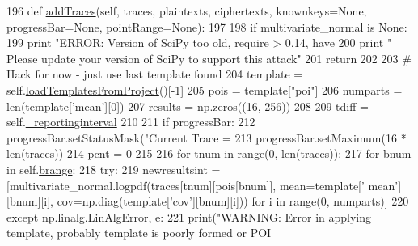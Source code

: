 \begin{DoxyCode}
196     \textcolor{keyword}{def }\hyperlink{classsoftware_1_1chipwhisperer_1_1analyzer_1_1attacks_1_1profiling__algorithms_1_1template_1_1ProfilingTemplate_ab2ab00186a9f5f55029d96a0507f5705}{addTraces}(self, traces, plaintexts, ciphertexts, knownkeys=None, progressBar=None, 
      pointRange=None):
197 
198         \textcolor{keywordflow}{if} multivariate\_normal \textcolor{keywordflow}{is} \textcolor{keywordtype}{None}:
199             \textcolor{keywordflow}{print} \textcolor{stringliteral}{"ERROR: Version of SciPy too old, require > 0.14, have %
200             \textcolor{keywordflow}{print} \textcolor{stringliteral}{"       Please update your version of SciPy to support this attack"}
201             \textcolor{keywordflow}{return}
202 
203         \textcolor{comment}{# Hack for now - just use last template found}
204         template = self.\hyperlink{classsoftware_1_1chipwhisperer_1_1analyzer_1_1attacks_1_1profiling__algorithms_1_1template_1_1ProfilingTemplate_a5fd92be2bd7bebc72dbf65264986b1fe}{loadTemplatesFromProject}()[-1]
205         pois = template[\textcolor{stringliteral}{"poi"}]
206         numparts = len(template[\textcolor{stringliteral}{'mean'}][0])
207         results = np.zeros((16, 256))
208 
209         tdiff = self.\hyperlink{classsoftware_1_1chipwhisperer_1_1analyzer_1_1attacks_1_1profiling__algorithms_1_1template_1_1ProfilingTemplate_a6730e93e246db67fda25b1a4bae118ba}{\_reportinginterval}
210 
211         \textcolor{keywordflow}{if} progressBar:
212             progressBar.setStatusMask(\textcolor{stringliteral}{"Current Trace = %
213             progressBar.setMaximum(16 * len(traces))
214         pcnt = 0
215 
216         \textcolor{keywordflow}{for} tnum \textcolor{keywordflow}{in} range(0, len(traces)):
217             \textcolor{keywordflow}{for} bnum \textcolor{keywordflow}{in} self.\hyperlink{classsoftware_1_1chipwhisperer_1_1analyzer_1_1attacks_1_1profiling__algorithms_1_1template_1_1ProfilingTemplate_a3fa5a3b2304e49b52cf7672c120f5908}{brange}:
218                 \textcolor{keywordflow}{try}:
219                     newresultsint = [multivariate\_normal.logpdf(traces[tnum][pois[bnum]], mean=template[\textcolor{stringliteral}{'
      mean'}][bnum][i], cov=np.diag(template[\textcolor{stringliteral}{'cov'}][bnum][i])) \textcolor{keywordflow}{for} i \textcolor{keywordflow}{in} range(0, numparts)]
220                 \textcolor{keywordflow}{except} np.linalg.LinAlgError, e:
221                     print(\textcolor{stringliteral}{"WARNING: Error in applying template, probably template is poorly formed or POI
}}}
\end{DoxyCode}
